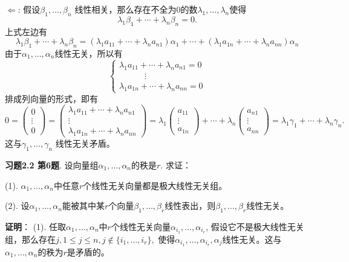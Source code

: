 $\Longleftarrow$: 假设$\beta_1, \ldots, \beta_n$ 线性相关，那么存在不全为0的数$\lambda_1, \ldots, \lambda_n$使得
$$\lambda_1 \beta_1 + \cdots + \lambda_n \beta_n = 0.$$
上式左边有
$$\lambda_1 \beta_1 + \cdots + \lambda_n \beta_n = (\lambda_1 a_{11} + \cdots + \lambda_n a_{n1}) \alpha_1 + \cdots + (\lambda_1 a_{1n} + \cdots + \lambda_n a_{nn}) \alpha_n$$
由于$\alpha_1, \ldots, \alpha_n$线性无关，所以有
$$
\begin{cases}
\lambda_1 a_{11} + \cdots + \lambda_n a_{n1} = 0\\
\hspace{3em} \vdots \\
\lambda_1 a_{1n} + \cdots + \lambda_n a_{nn} = 0
\end{cases}
$$
排成列向量的形式，即有
$$0 = \begin{pmatrix} 0 \\ \vdots \\ 0 \end{pmatrix} = \begin{pmatrix} \lambda_1 a_{11} + \cdots + \lambda_n a_{n1} \\ \vdots \\ \lambda_1 a_{1n} + \cdots + \lambda_n a_{nn} \end{pmatrix} = \lambda_1 \begin{pmatrix} a_{11} \\ \vdots \\ a_{1n} \end{pmatrix} + \cdots + \lambda_n \begin{pmatrix} a_{n1} \\ \vdots \\ a_{nn} \end{pmatrix} = \lambda_1 \gamma_1 + \cdots + \lambda_n \gamma_n.$$
这与$\gamma_1, \ldots, \gamma_n$ 线性无关矛盾。

\fi  %

\newpageorvspace

{\bf 习题2.2 第6题}. 设向量组$\alpha_1, \ldots, \alpha_n$的秩是$r.$ 求证：

(1). $\alpha_1, \ldots, \alpha_n$中任意$r$个线性无关向量都是极大线性无关组。

(2). 设$\alpha_1, \ldots, \alpha_n$能被其中某$r$个向量$\beta_1, \ldots, \beta_r$线性表出，则$\beta_1, \ldots, \beta_r$线性无关。

\ifIncludeAnswer

\newpageorvspace

{\bf 证明}： (1). 任取$\alpha_1, \ldots, \alpha_n$中$r$个线性无关向量$\alpha_{i_1}, \ldots, \alpha_{i_r}$, 假设它不是极大线性无关组，那么存在$j, 1\leqslant j \leqslant n, j\not\in \{i_1, \ldots, i_r \},$ 使得$\alpha_{i_1}, \ldots, \alpha_{i_r}, \alpha_j$线性无关。这与$\alpha_1, \ldots, \alpha_n$的秩为$r$是矛盾的。

